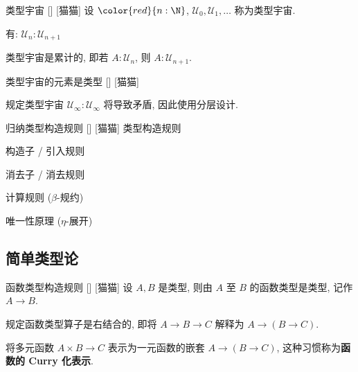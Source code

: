 \documentclass[UTF8]{ctexart}
\begin{document}
        \begin{axm}
            []
            {类型宇宙}
            []
            [猫猫]
            设 \(\color{red}{n:\N}\), \(\mathcal{U}_0, \mathcal{U}_1, \dots\) 称为类型宇宙. 

            有: \(\mathcal{U}_n:\mathcal{U}_{n+1}\)

            类型宇宙是累计的, 即若 \(A:\mathcal{U}_n\), 则 \(A:\mathcal{U}_{n+1}\). 
        \end{axm}
        
        \begin{ppt}
            []
            {类型宇宙的元素是类型}
            []
            [猫猫]
        \end{ppt}
        
        \begin{rmk}
            规定类型宇宙 \(\mathcal{U}_{\infty}:\mathcal{U}_{\infty}\) 将导致矛盾, 因此使用分层设计. 
        \end{rmk}
        
        \begin{axm}
            []
            {归纳类型构造规则}
            []
            [猫猫]
            类型构造规则

            构造子 / 引入规则

            消去子 / 消去规则

            计算规则 ($\beta$-规约)

            唯一性原理 ($\eta$-展开)
        \end{axm}

    \subsection{简单类型论}
        
        \begin{axm}
            []
            {函数类型构造规则}
            []
            [猫猫]
            设 \(A, B\) 是类型, 则由 \(A\) 至 \(B\) 的函数类型是类型, 记作 \(A \to B\). 
        \end{axm}
        
        \begin{rmk}
            [猫猫]
            规定函数类型算子是右结合的, 即将 \(A \to B \to C\) 解释为 \(A \to (B \to C)\). 
        \end{rmk}
        
        \begin{rmk}
            [猫猫]
            将多元函数 \(A\times B\to C\) 表示为一元函数的嵌套 \(A\to (B\to C)\), 这种习惯称为\textbf{函数的 Curry 化表示}. 
        \end{rmk}
        
\end{document}
